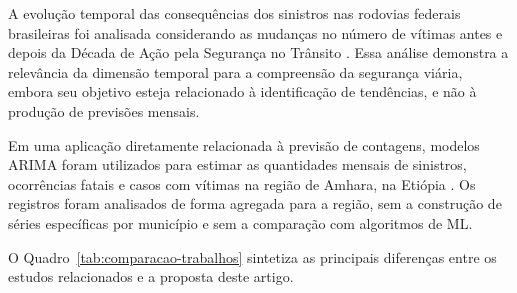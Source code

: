 \documentclass[12pt]{article}
\begin{document}
A evolução temporal das consequências dos sinistros nas rodovias federais brasileiras foi analisada considerando as mudanças no número de vítimas antes e depois da Década de Ação pela Segurança no Trânsito \cite{moraisneto2021tendencia}. Essa análise demonstra a relevância da dimensão temporal para a compreensão da segurança viária, embora seu objetivo esteja relacionado à identificação de tendências, e não à produção de previsões mensais.

Em uma aplicação diretamente relacionada à previsão de contagens, modelos ARIMA foram utilizados para estimar as quantidades mensais de sinistros, ocorrências fatais e casos com vítimas na região de Amhara, na Etiópia \cite{getahun2021timeseries}. Os registros foram analisados de forma agregada para a região, sem a construção de séries específicas por município e sem a comparação com algoritmos de ML.

O Quadro~\ref{tab:comparacao-trabalhos} sintetiza as principais diferenças entre os estudos relacionados e a proposta deste artigo.
\end{document}

